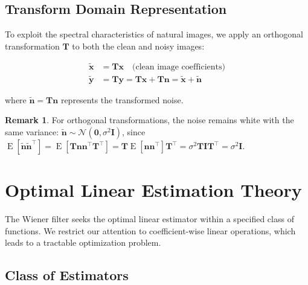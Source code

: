\documentclass[12pt]{article}
\renewcommand{\vec}[1]{\mathbf{#1}}
\DeclareMathOperator{\E}{E}
\newcommand{\trans}[1]{#1^{\top}}
\theoremstyle{definition}
\newtheorem{remark}[theorem]{Remark}
\begin{document}

\subsection{Transform Domain Representation}
\label{subsec:transform_domain}

To exploit the spectral characteristics of natural images, we apply an orthogonal transformation $\mathbf{T}$ to both the clean and noisy images:

\begin{align}
    \label{eq:transform_domain}
    \tilde{\vec{x}} & = \mathbf{T}\vec{x} \quad \text{(clean image coefficients)}                                     \\
    \tilde{\vec{y}} & = \mathbf{T}\vec{y} = \mathbf{T}\vec{x} + \mathbf{T}\vec{n} = \tilde{\vec{x}} + \tilde{\vec{n}}
\end{align}

where $\tilde{\vec{n}} = \mathbf{T}\vec{n}$ represents the transformed noise.

\begin{remark}
    For orthogonal transformations, the noise remains white with the same variance: $\tilde{\vec{n}} \sim \mathcal{N}(\vec{0}, \sigma^2 \mathbf{I})$, since $\E[\tilde{\vec{n}}\trans{\tilde{\vec{n}}}] = \E[\mathbf{T}\vec{n}\trans{\vec{n}}\trans{\mathbf{T}}] = \mathbf{T}\E[\vec{n}\trans{\vec{n}}]\trans{\mathbf{T}} = \sigma^2 \mathbf{T}\mathbf{I}\trans{\mathbf{T}} = \sigma^2 \mathbf{I}$.
\end{remark}

\newpage


\section{Optimal Linear Estimation Theory}
\label{sec:optimal_estimation}

The Wiener filter seeks the optimal linear estimator within a specified class of functions. We restrict our attention to coefficient-wise linear operations, which leads to a tractable optimization problem.

\subsection{Class of Estimators}
\label{subsec:estimator_class}
\end{document}
